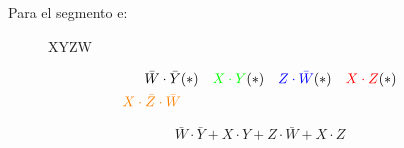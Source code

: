 Para el segmento e:
\begin{figure}[H]
  \begin{center}
    \begin{Karnaugh}{X}{Y}{Z}{W}
    \end{Karnaugh}
  \end{center}
\end{figure}

\begin{align*}
  \bar{W} \cdot \bar{Y} & (*) &
  \color{green} X \cdot Y & (*) &
  \color{blue} Z \cdot \bar{W} & (*) &
  \color{red} X \cdot Z & (*) \\
  \color{orange} X \cdot \bar{Z} \cdot \bar{W} & &
\end{align*}

\begin{equation*}
    \bar{W} \cdot \bar{Y} +
    X \cdot Y +
    Z \cdot \bar{W} +
    X \cdot Z
\end{equation*}
